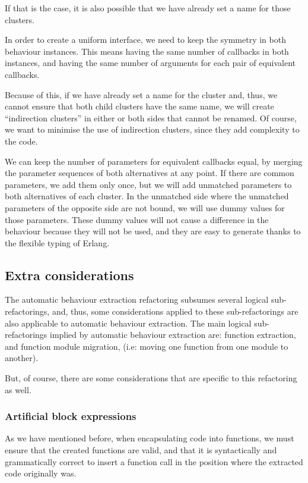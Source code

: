 If that is the case, it is also possible that we have already set a
name for those clusters.

In order to create a uniform interface, we need to keep the symmetry
in both behaviour instances. This means having the same number of
callbacks in both instances, and having the same number of arguments
for each pair of equivalent callbacks.

Because of this, if we have already set a name for the cluster and,
thus, we cannot ensure that both child clusters have the same name,
we will create ``indirection clusters'' in either or both 
sides that cannot be renamed. Of course, we want
to minimise the use of indirection clusters, since they add complexity
to the code.

We can keep the number of parameters for equivalent callbacks equal,
by merging the parameter sequences of both alternatives at any point. If there
are common parameters, we add them only once, but we will add unmatched
parameters to both alternatives of each cluster. In the unmatched
side where the unmatched parameters of the opposite side are not bound,
we will use dummy values for those parameters. These dummy values
will not cause a difference in the behaviour because they will not
be used, and they are easy to generate thanks to the flexible typing
of Erlang.

\subsection{Extra considerations}

The automatic behaviour extraction refactoring subsumes several logical
sub-refactorings, and, thus, some considerations applied to these sub-refactorings
are also applicable to automatic behaviour extraction. The main logical
sub-refactorings implied by automatic behaviour extraction are: function
extraction, and function module migration, (i.e: moving one function
from one module to another).

But, of course, there are some considerations that are specific to
this refactoring as well.

\subsubsection{Artificial block expressions\label{sub:artificial-block-expressions}}

As we have mentioned before, when encapsulating code into functions,
we must ensure that the created functions are valid, and that it is
syntactically and grammatically correct to insert a function call
in the position where the extracted code originally was.

